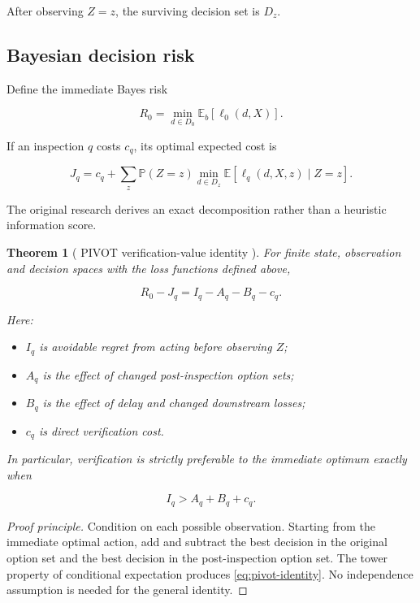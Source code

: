 \documentclass[10pt,a4paper]{article}
\newcommand{\PP}{\mathbb{P}}
\newcommand{\EE}{\mathbb{E}}
\theoremstyle{plain}
\newtheorem{theorem}{Theorem}[section]
\theoremstyle{definition}
\theoremstyle{remark}
\begin{document}
After observing \(Z=z\),
the surviving decision set is \(D_z\).

\subsection{Bayesian decision risk}

Define the immediate Bayes risk

\begin{equation}
R_0=
\min_{d\in D_0}
\EE_b[\ell_0(d,X)].
\label{eq:immediate-risk}
\end{equation}

If an inspection \(q\) costs \(c_q\),
its optimal expected cost is

\begin{equation}
J_q=
c_q+
\sum_z
\PP(Z=z)
\min_{d\in D_z}
\EE[\ell_q(d,X,z)\mid Z=z].
\label{eq:verification-risk}
\end{equation}

The original research derives an exact
decomposition rather than a heuristic
information score.

\begin{theorem}[
PIVOT verification-value identity
\cite{relaymodel2}
]
For finite state, observation and decision
spaces with the loss functions defined
above,

\begin{equation}
R_0-J_q
=
I_q-A_q-B_q-c_q.
\label{eq:pivot-identity}
\end{equation}

Here:

\begin{itemize}[leftmargin=18pt,itemsep=2pt]
\item \(I_q\) is avoidable regret
from acting before observing \(Z\);
\item \(A_q\) is the effect of
changed post-inspection option sets;
\item \(B_q\) is the effect of
delay and changed downstream losses;
\item \(c_q\) is direct verification cost.
\end{itemize}

In particular, verification is strictly preferable
to the immediate optimum exactly when

\[
I_q>A_q+B_q+c_q.
\]
\end{theorem}

\begin{proof}[Proof principle]
Condition on each possible observation.
Starting from the immediate optimal action,
add and subtract the best decision in
the original option set and the best
decision in the post-inspection option set.
The tower property of conditional expectation
produces \eqref{eq:pivot-identity}.
No independence assumption is needed
for the general identity.
\end{proof}
\end{document}
